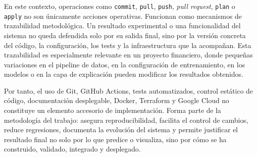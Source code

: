 En este contexto, operaciones como \texttt{commit}, \texttt{pull}, \texttt{push}, \emph{pull request}, \texttt{plan} o \texttt{apply} no son únicamente acciones operativas. Funcionan como mecanismos de trazabilidad metodológica. Un resultado experimental o una funcionalidad del sistema no queda defendida solo por su salida final, sino por la versión concreta del código, la configuración, los tests y la infraestructura que la acompañan. Esta trazabilidad es especialmente relevante en un proyecto financiero, donde pequeñas variaciones en el pipeline de datos, en la configuración de entrenamiento, en los modelos o en la capa de explicación pueden modificar los resultados obtenidos.

Por tanto, el uso de Git, GitHub Actions, tests automatizados, control estático de código, documentación desplegable, Docker, Terraform y Google Cloud no constituye un elemento accesorio de implementación. Forma parte de la metodología del trabajo: asegura reproducibilidad, facilita el control de cambios, reduce regresiones, documenta la evolución del sistema y permite justificar el resultado final no solo por lo que predice o visualiza, sino por cómo se ha construido, validado, integrado y desplegado.



